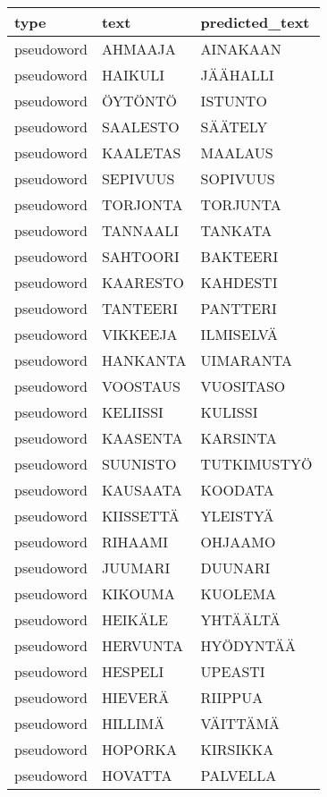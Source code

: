 \begin{tabular}{lll}
\toprule
       type &       text & predicted\_text \\
\midrule
 pseudoword &    AHMAAJA &       AINAKAAN \\
 pseudoword &    HAIKULI &       JÄÄHALLI \\
 pseudoword &    ÖYTÖNTÖ &        ISTUNTO \\
 pseudoword &   SAALESTO &        SÄÄTELY \\
 pseudoword &   KAALETAS &        MAALAUS \\
 pseudoword &   SEPIVUUS &       SOPIVUUS \\
 pseudoword &   TORJONTA &       TORJUNTA \\
 pseudoword &   TANNAALI &        TANKATA \\
 pseudoword &   SAHTOORI &       BAKTEERI \\
 pseudoword &   KAARESTO &       KAHDESTI \\
 pseudoword &   TANTEERI &       PANTTERI \\
 pseudoword &   VIKKEEJA &      ILMISELVÄ \\
 pseudoword &   HANKANTA &      UIMARANTA \\
 pseudoword &   VOOSTAUS &      VUOSITASO \\
 pseudoword &   KELIISSI &        KULISSI \\
 pseudoword &   KAASENTA &       KARSINTA \\
 pseudoword &   SUUNISTO &    TUTKIMUSTYÖ \\
 pseudoword &   KAUSAATA &        KOODATA \\
 pseudoword &  KIISSETTÄ &       YLEISTYÄ \\
 pseudoword &    RIHAAMI &        OHJAAMO \\
 pseudoword &    JUUMARI &        DUUNARI \\
 pseudoword &    KIKOUMA &        KUOLEMA \\
 pseudoword &    HEIKÄLE &       YHTÄÄLTÄ \\
 pseudoword &   HERVUNTA &      HYÖDYNTÄÄ \\
 pseudoword &    HESPELI &        UPEASTI \\
 pseudoword &    HIEVERÄ &        RIIPPUA \\
 pseudoword &    HILLIMÄ &       VÄITTÄMÄ \\
 pseudoword &    HOPORKA &       KIRSIKKA \\
 pseudoword &    HOVATTA &       PALVELLA \\

\end{tabular}

